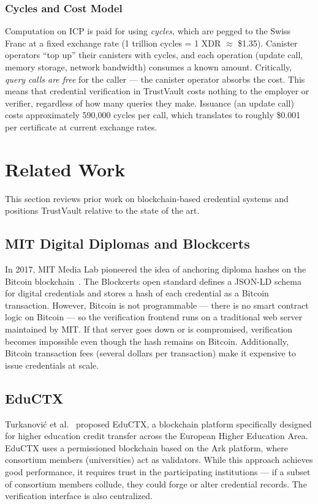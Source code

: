 \documentclass[journal]{IEEEtran}
\begin{document}
\subsubsection{Cycles and Cost Model}
Computation on ICP is paid for using \emph{cycles}, which are pegged to the Swiss Franc at a fixed exchange rate (1 trillion cycles = 1 XDR $\approx$ \$1.35). Canister operators ``top up'' their canisters with cycles, and each operation (update call, memory storage, network bandwidth) consumes a known amount. Critically, \emph{query calls are free} for the caller — the canister operator absorbs the cost. This means that credential verification in TrustVault costs nothing to the employer or verifier, regardless of how many queries they make. Issuance (an update call) costs approximately 590,000 cycles per call, which translates to roughly \$0.001 per certificate at current exchange rates.

\section{Related Work}
\label{sec:related}

This section reviews prior work on blockchain-based credential systems and positions TrustVault relative to the state of the art.

\subsection{MIT Digital Diplomas and Blockcerts}
In 2017, MIT Media Lab pioneered the idea of anchoring diploma hashes on the Bitcoin blockchain~\cite{grech2017blockchain}. The Blockcerts open standard defines a JSON-LD schema for digital credentials and stores a hash of each credential as a Bitcoin transaction. However, Bitcoin is not programmable — there is no smart contract logic on Bitcoin — so the verification frontend runs on a traditional web server maintained by MIT. If that server goes down or is compromised, verification becomes impossible even though the hash remains on Bitcoin. Additionally, Bitcoin transaction fees (several dollars per transaction) make it expensive to issue credentials at scale.

\subsection{EduCTX}
Turkanovi\'{c} et al.~\cite{turk2018eductx} proposed EduCTX, a blockchain platform specifically designed for higher education credit transfer across the European Higher Education Area. EduCTX uses a permissioned blockchain based on the Ark platform, where consortium members (universities) act as validators. While this approach achieves good performance, it requires trust in the participating institutions — if a subset of consortium members collude, they could forge or alter credential records. The verification interface is also centralized.
\end{document}
